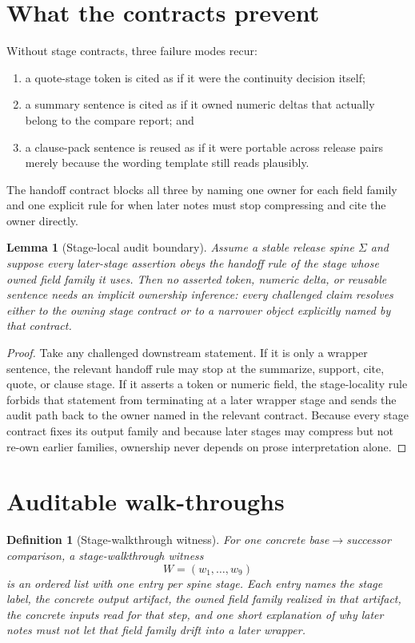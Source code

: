 \documentclass[11pt]{article}
\newtheorem{definition}{Definition}
\newtheorem{lemma}{Lemma}
\begin{document}
\section{What the contracts prevent}
Without stage contracts, three failure modes recur:
\begin{enumerate}[leftmargin=*]
\item a quote-stage token is cited as if it were the continuity decision itself;
\item a summary sentence is cited as if it owned numeric deltas that actually belong to the compare report; and
\item a clause-pack sentence is reused as if it were portable across release pairs merely because the wording template still reads plausibly.
\end{enumerate}
The handoff contract blocks all three by naming one owner for each field family and one explicit rule for when later notes must stop compressing and cite the owner directly.

\begin{lemma}[Stage-local audit boundary]
Assume a stable release spine $\Sigma$ and suppose every later-stage assertion obeys the handoff rule of the stage whose owned field family it uses.
Then no asserted token, numeric delta, or reusable sentence needs an implicit ownership inference: every challenged claim resolves either to the owning stage contract or to a narrower object explicitly named by that contract.
\end{lemma}

\begin{proof}
Take any challenged downstream statement.
If it is only a wrapper sentence, the relevant handoff rule may stop at the summarize, support, cite, quote, or clause stage.
If it asserts a token or numeric field, the stage-locality rule forbids that statement from terminating at a later wrapper stage and sends the audit path back to the owner named in the relevant contract.
Because every stage contract fixes its output family and because later stages may compress but not re-own earlier families, ownership never depends on prose interpretation alone.
\end{proof}

\section{Auditable walk-throughs}

\begin{definition}[Stage-walkthrough witness]
For one concrete base$\to$successor comparison, a \emph{stage-walkthrough witness}
\[
W=(w_1,\dots,w_9)
\]
is an ordered list with one entry per spine stage.
Each entry names the stage label, the concrete output artifact, the owned field family realized in that artifact, the concrete inputs read for that step, and one short explanation of why later notes must not let that field family drift into a later wrapper.
\end{definition}
\end{document}
